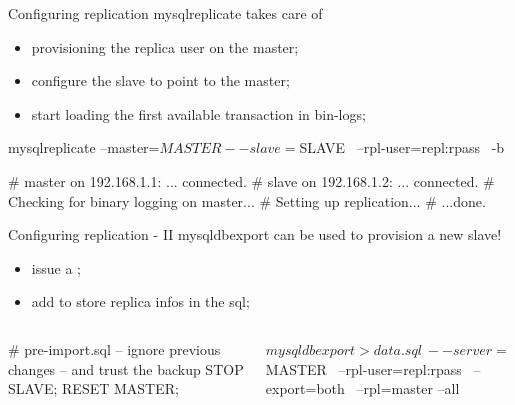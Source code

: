 \documentclass{beamer}[10]
\begin{document}
\begin{pyframe}{Configuring replication}
mysqlreplicate takes care of
\begin{itemize}
\item provisioning the replica user on the master;
\item configure the slave to point to the master;
\item start loading the first available transaction in bin-logs;
\end{itemize}

\begin{bashcode}
    mysqlreplicate  --master=$MASTER --slave=$SLAVE \
     --rpl-user=repl:rpass \
     -b

    # master on 192.168.1.1: ... connected.
    # slave on 192.168.1.2: ... connected.
    # Checking for binary logging on master...
    # Setting up replication...
    # ...done.
\end{bashcode}
\end{pyframe}


\begin{pyframe}{Configuring replication - II}
mysqldbexport can be used to provision a new slave!
\begin{itemize}
\item issue a ;
\item add \code{--rpl=master} to store replica infos in the sql;
\end{itemize}

\begin{columns}

\begin{bashcode}
# pre-import.sql
-- ignore previous changes
-- and trust the backup
STOP SLAVE;
RESET MASTER;
\end{bashcode}

\begin{pycode}
$ mysqldbexport > data.sql \
 --server=$MASTER \
 --rpl-user=repl:rpass \
 --export=both \
 --rpl=master --all

\end{pycode}
\end{columns}

\end{pyframe}

\end{document}
